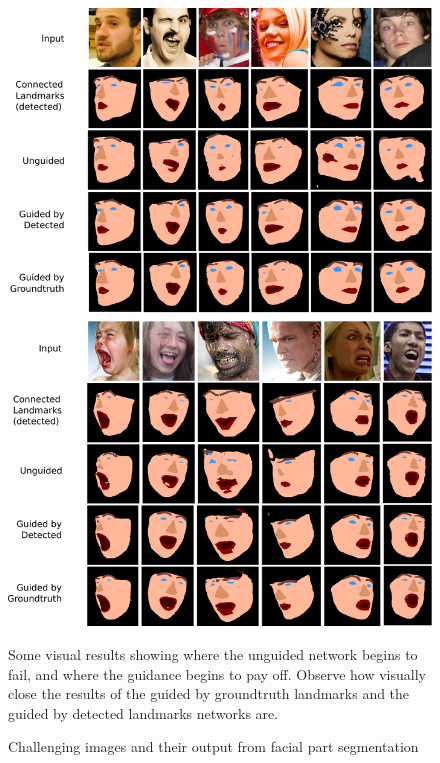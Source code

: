 \begin{figure}
\includegraphics[width=\linewidth]{figs/Visual.pdf}
\caption{Challenging images and their output from facial part
  segmentation}{Some visual results showing where the unguided network
  begins to fail, and where the guidance begins to pay off. Observe
  how visually close the results of the guided by groundtruth
  landmarks and the guided by detected landmarks networks are.}
\label{fig:visual}
\end{figure}

